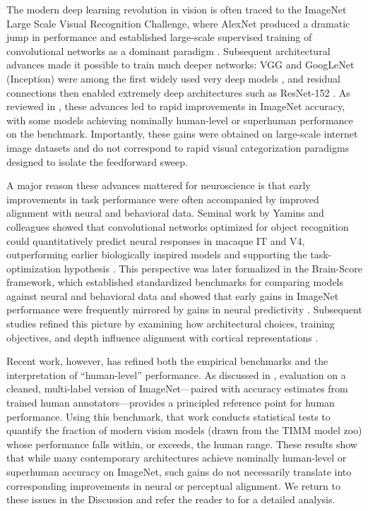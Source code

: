 \documentclass[11pt,a4paper]{article}
\begin{document}
The modern deep learning revolution in vision is often traced to the ImageNet Large Scale Visual Recognition Challenge, where AlexNet produced a dramatic jump in performance and established large-scale supervised training of convolutional networks as a dominant paradigm \citep{Krizhevsky2012,Russakovsky2015}. Subsequent architectural advances made it possible to train much deeper networks: VGG and GoogLeNet (Inception) were among the first widely used very deep models \citep{Simonyan2015,Szegedy2015}, and residual connections then enabled extremely deep architectures such as ResNet-152 \citep{He2016}. As reviewed in \citet{Serre2019ARVS}, these advances led to rapid improvements in ImageNet accuracy, with some models achieving nominally human-level or superhuman performance on the benchmark. Importantly, these gains were obtained on large-scale internet image datasets and do not correspond to rapid visual categorization paradigms designed to isolate the feedforward sweep.

A major reason these advances mattered for neuroscience is that early improvements in task performance were often accompanied by improved alignment with neural and behavioral data. Seminal work by Yamins and colleagues showed that convolutional networks optimized for object recognition could quantitatively predict neural responses in macaque IT and V4, outperforming earlier biologically inspired models and supporting the task-optimization hypothesis \citep{Yamins2014,Cadieu2014}. This perspective was later formalized in the Brain-Score framework, which established standardized benchmarks for comparing models against neural and behavioral data and showed that early gains in ImageNet performance were frequently mirrored by gains in neural predictivity \citep{Schrimpf2020}. Subsequent studies refined this picture by examining how architectural choices, training objectives, and depth influence alignment with cortical representations \citep{KhalighRazavi2014}.

Recent work, however, has refined both the empirical benchmarks and the interpretation of ``human-level'' performance. As discussed in \citet{LinsleyFengSerreTICS}, evaluation on a cleaned, multi-label version of ImageNet---paired with accuracy estimates from trained human annotators---provides a principled reference point for human performance. Using this benchmark, that work conducts statistical tests to quantify the fraction of modern vision models (drawn from the TIMM model zoo) whose performance falls within, or exceeds, the human range. These results show that while many contemporary architectures achieve nominally human-level or superhuman accuracy on ImageNet, such gains do not necessarily translate into corresponding improvements in neural or perceptual alignment. We return to these issues in the Discussion and refer the reader to \citet{LinsleyFengSerreTICS} for a detailed analysis.



\end{document}
